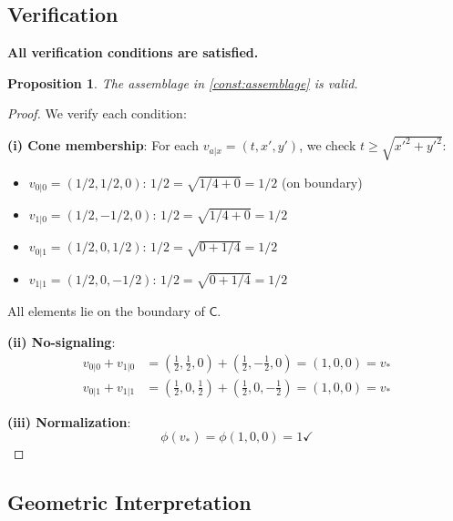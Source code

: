 \documentclass[11pt,a4paper]{article}
\newtheorem{proposition}[theorem]{Proposition}
\theoremstyle{definition}
\newcommand{\C}{\mathsf{C}}
\begin{document}
\subsection{Verification}

\begin{validbox}
\textbf{All verification conditions are satisfied.}
\end{validbox}

\begin{proposition}
The assemblage in \cref{const:assemblage} is valid.
\end{proposition}

\begin{proof}
We verify each condition:

\textbf{(i) Cone membership}: For each $v_{a|x} = (t, x', y')$, we check $t \geq \sqrt{x'^2 + y'^2}$:
\begin{itemize}
    \item $v_{0|0} = (1/2, 1/2, 0)$: $1/2 = \sqrt{1/4 + 0} = 1/2$ \checkmark (on boundary)
    \item $v_{1|0} = (1/2, -1/2, 0)$: $1/2 = \sqrt{1/4 + 0} = 1/2$ \checkmark
    \item $v_{0|1} = (1/2, 0, 1/2)$: $1/2 = \sqrt{0 + 1/4} = 1/2$ \checkmark
    \item $v_{1|1} = (1/2, 0, -1/2)$: $1/2 = \sqrt{0 + 1/4} = 1/2$ \checkmark
\end{itemize}
All elements lie on the boundary of $\C$.

\textbf{(ii) No-signaling}:
\begin{align}
v_{0|0} + v_{1|0} &= \left(\frac{1}{2}, \frac{1}{2}, 0\right) + \left(\frac{1}{2}, -\frac{1}{2}, 0\right) = (1, 0, 0) = v_* \\
v_{0|1} + v_{1|1} &= \left(\frac{1}{2}, 0, \frac{1}{2}\right) + \left(\frac{1}{2}, 0, -\frac{1}{2}\right) = (1, 0, 0) = v_*
\end{align}

\textbf{(iii) Normalization}:
\[
\phi(v_*) = \phi(1, 0, 0) = 1 \checkmark
\]
\end{proof}

\subsection{Geometric Interpretation}
\end{document}
